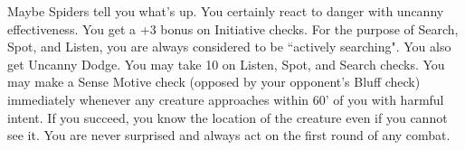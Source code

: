 {Maybe Spiders tell you what's up. You certainly react to danger with uncanny effectiveness.}
{You get a +3 bonus on Initiative checks.}
{For the purpose of Search, Spot, and Listen, you are always considered to be ``actively searching". You also get Uncanny Dodge.}
{You may take 10 on Listen, Spot, and Search checks.}
{You may make a Sense Motive check (opposed by your opponent's Bluff check) immediately whenever any creature approaches within 60' of you with harmful intent. If you succeed, you know the location of the creature even if you cannot see it.}
{You are never surprised and always act on the first round of any combat.}